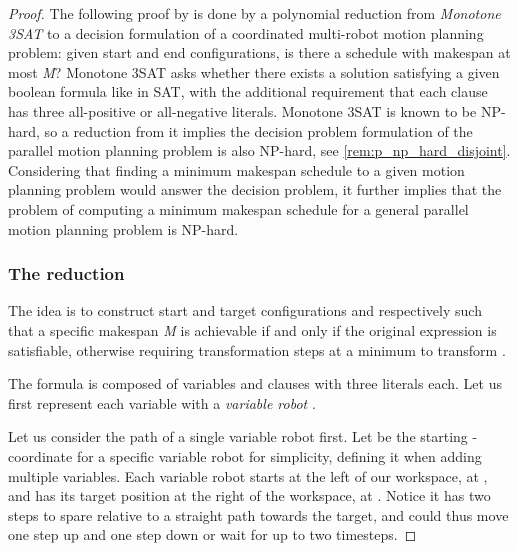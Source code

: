 \begin{proof}
	The following proof by \cite{siamcomp/DemaineFKMS19} is done by a polynomial reduction from \emph{Monotone 3SAT} to a decision formulation of a coordinated multi-robot motion planning problem: given start and end configurations, is there a schedule with makespan at most \emph{M}? Monotone 3SAT asks whether there exists a solution satisfying a given boolean formula \ilmath{\varphi} like in SAT, with the additional requirement that each clause has three all-positive or all-negative literals. Monotone 3SAT is known to be NP-hard, so a reduction from it implies the decision problem formulation of the parallel motion planning problem is also NP-hard, see \cref{rem:p_np_hard_disjoint}. Considering that finding a minimum makespan schedule to a given motion planning problem would answer the decision problem, it further implies that the problem of computing a minimum makespan schedule for a general parallel motion planning problem is NP-hard.

	\subsubsection*{The reduction} 
	The idea is to construct start and target configurations  and  respectively such that a specific makespan \emph{M} is achievable if and only if the original expression \ilmath{\varphi} is satisfiable, otherwise requiring  transformation steps at a minimum to transform .


	The formula \ilmath{\varphi} is composed of  variables  and  clauses  with three literals each. Let us first represent each variable  with a \emph{variable robot} .

	Let us consider the path of a single variable robot  first. Let  be the starting -coordinate for a specific variable robot  for simplicity, defining it when adding multiple variables. Each variable robot starts at the left of our workspace, at , and has its target position at the right of the workspace, at . Notice it has two steps to spare relative to a straight path towards the target, and could thus move one step up and one step down or wait for up to two timesteps. 


\end{proof}
